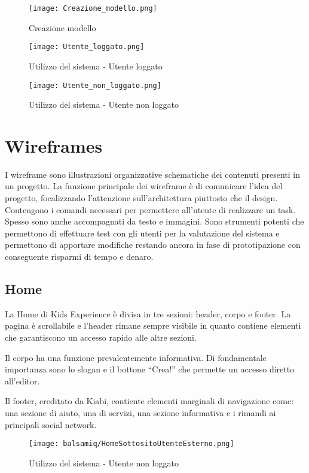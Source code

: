 \documentclass[12pt,italian,]{report}
\begin{document}
\begin{figure}
\centering
\texttt{[image: Creazione\_modello.png]}
\caption{Creazione modello}
\end{figure}

\begin{figure}
\centering
\texttt{[image: Utente\_loggato.png]}
\caption{Utilizzo del sistema - Utente loggato}
\end{figure}

\begin{figure}
\centering
\texttt{[image: Utente\_non\_loggato.png]}
\caption{Utilizzo del sistema - Utente non loggato}
\end{figure}

\hypertarget{wireframes}{%
\section{Wireframes}\label{wireframes}}

I wireframe sono illustrazioni organizzative schematiche dei contenuti
presenti in un progetto. La funzione principale dei wireframe è di
comunicare l'idea del progetto, focalizzando l'attenzione
sull'architettura piuttosto che il design. Contengono i comandi
necessari per permettere all'utente di realizzare un task. Spesso sono
anche accompagnati da testo e immagini. Sono strumenti potenti che
permettono di effettuare test con gli utenti per la valutazione del
sistema e permettono di apportare modifiche restando ancora in fase di
prototipazione con conseguente risparmi di tempo e denaro.

\hypertarget{home}{%
\subsection{Home}\label{home}}

La Home di Kids Experience è divisa in tre sezioni: header, corpo e
footer. La pagina è scrollabile e l'header rimane sempre visibile in
quanto contiene elementi che garantiscono un accesso rapido alle altre
sezioni.

Il corpo ha una funzione prevalentemente informativa. Di fondamentale
importanza sono lo slogan e il bottone ``Crea!'' che permette un accesso
diretto all'editor.

Il footer, ereditato da Kiabi, contiente elementi marginali di
navigazione come: una sezione di aiuto, una di servizi, una sezione
informativa e i rimandi ai principali social network.

\begin{figure}
\centering
\texttt{[image: balsamiq/HomeSottositoUtenteEsterno.png]}
\caption{Utilizzo del sistema - Utente non loggato}
\end{figure}
\end{document}
